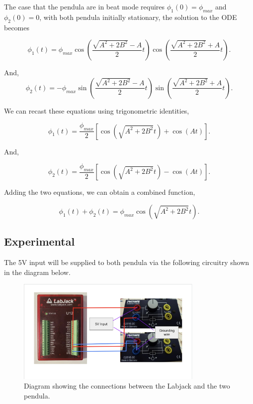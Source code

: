 \documentclass{article}
\begin{document}
The case that the pendula are in beat mode requires $\phi_1(0) = \phi
_{max}$ and $\phi_2(0) = 0$, with both pendula initially stationary,
the solution to the ODE becomes

\begin{equation} 
    \phi_1(t) = \phi_{max}\cos{\left(\frac{\sqrt{A^2+2B^2}-A}{2}t\right)}
    \cos{\left(\frac{\sqrt{A^2+2B^2}+A}{2}t\right)}.
\end{equation}

And,
\begin{equation} 
    \phi_2(t) = -\phi_{max}\sin{\left(\frac{\sqrt{A^2+2B^2}-A}{2}t\right)}
    \sin{\left(\frac{\sqrt{A^2+2B^2}+A}{2}t\right)}.
\end{equation}

We can recast these equations using trigonometric identities,

\begin{equation}
    \phi_1(t) = \frac{\phi_{max}}{2}\left[\cos{\left(
    \sqrt{A^2+2B^2}t\right)}+\cos{\left(A t\right)}\right].
\end{equation}

And,

\begin{equation}
    \phi_2(t) = \frac{\phi_{max}}{2}\left[\cos{\left(
    \sqrt{A^2+2B^2}t\right)}-\cos{\left(A t\right)}\right].
\end{equation}

Adding the two equations, we can obtain a combined function,

\begin{equation} 
    \phi_1(t)+\phi_2(t) = \phi_{max}\cos{\left(\sqrt{A^2+
    2B^2}t\right)}.
\end{equation}
\subsection{Experimental}
The 5V input will be supplied to both pendula via the following
circuitry shown in the diagram below.

\begin{figure} [H]
    \centering
    \includegraphics[width=0.8\textwidth]{circuit.png}
    \caption{Diagram showing the connections between the
    Labjack and the two pendula.}
    \label{fig:circuit}
\end{figure}
\end{document}
